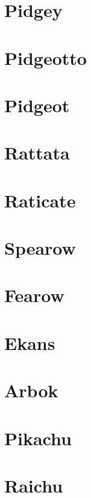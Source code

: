 \section{Pidgey}
\label{exp:Pidgey}
\section{Pidgeotto}
\label{exp:Pidgeotto}
\section{Pidgeot}
\label{exp:Pidgeot}
\section{Rattata}
\label{exp:Rattata}
\section{Raticate}
\label{exp:Raticate}
\section{Spearow}
\label{exp:Spearow}
\section{Fearow}
\label{exp:Fearow}
\section{Ekans}
\label{exp:Ekans}
\section{Arbok}
\label{exp:Arbok}
\section{Pikachu}
\label{exp:Pikachu}
\section{Raichu}
\label{exp:Raichu}
